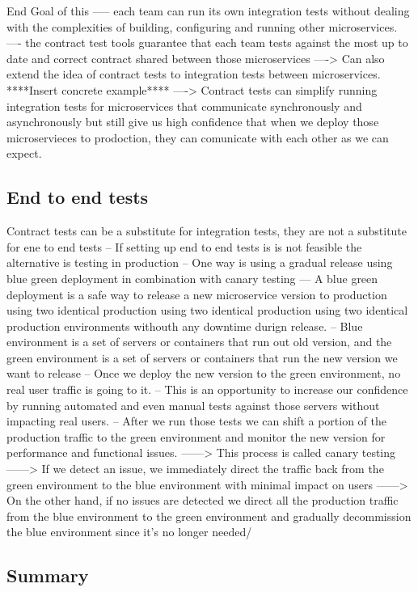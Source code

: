 \documentclass[a4paper, 11pt]{book}
\begin{document}
    End Goal of this ----- each team can run its own integration tests without dealing with the complexities of building, configuring and running other microservices.
    ---- the contract test tools guarantee that each team tests against the most up to date and correct contract shared between those microservices
    ----> Can also extend the idea of contract tests to integration tests between microservices. ****Insert concrete example****
    ----> Contract tests can simplify running integration tests for microservices that communicate synchronously and asynchronously but still give us high confidence that when we deploy those microservieces to prodoction, they can comunicate with each other as we can expect.

    \subsection{End to end tests}
    Contract tests can be a substitute for integration tests, they are not a substitute for ene to end tests
    -- If setting up end to end tests is is not feasible the alternative is testing in production
    -- One way is using a gradual release using blue green deployment in combination with canary testing
    --- A blue green deployment is a safe way to release a new microservice version to production using two identical production using two identical production using two identical production environments withouth any downtime durign release.
    -- Blue environment is a set of servers or containers that run out old version, and the green environment is a set of servers or containers that run the new version we want to release
    -- Once we deploy the new version to the green environment, no real user traffic is going to it.
    -- This is an opportunity to increase our confidence by running automated and even manual tests against those servers without impacting real users.
    -- After we run those tests we can shift a portion of the production traffic to the green environment and monitor the new version for performance and functional issues.
    ------> This process is called canary testing
    ------> If we detect an issue, we immediately direct the traffic back from the green environment to the blue environment with minimal impact on users
    ------> On the other hand, if no issues are detected we direct all the production traffic from the blue environment to the green environment and gradually decommission the blue environment since it's no longer needed/

    \subsection{Summary}
\end{document}
